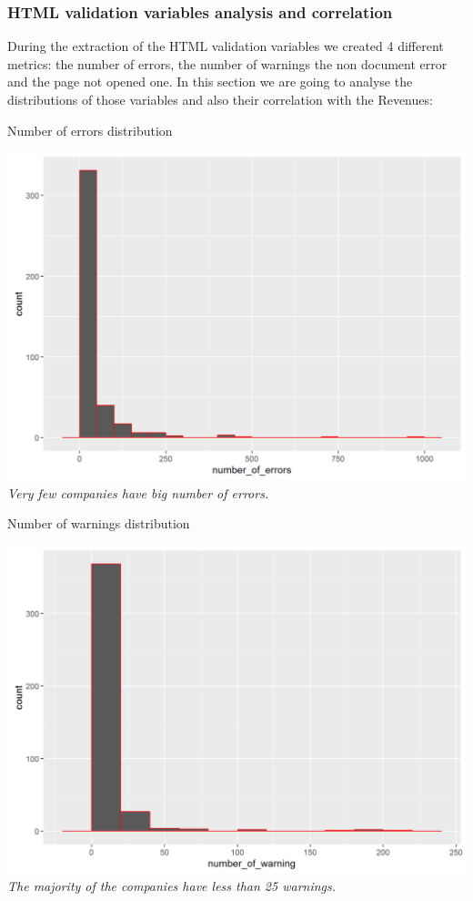 \documentclass{book}
\begin{document}
\subsubsection{HTML validation variables analysis and correlation}
During the extraction of the HTML validation variables we created 4 different metrics: the number of errors, the number of warnings the non document error and the page not opened one. In this section we are going to analyse the distributions of those variables and also their correlation with the Revenues:
\begin{table}[H]
\centering
\caption{Number of errors distribution}
\begin{center}
\includegraphics[scale=0.5]{../R/photos/44_errors_dist.png}    \\
\textit{Very few companies have big number of errors.}
\end{center}
\end{table}
\begin{table}[H]
\centering
\caption{Number of warnings distribution}
\begin{center}
\includegraphics[scale=0.5]{../R/photos/46_warn_dist.png}    \\
\textit{The majority of the companies have less than 25 warnings.}
\end{center}
\end{table}
\end{document}
